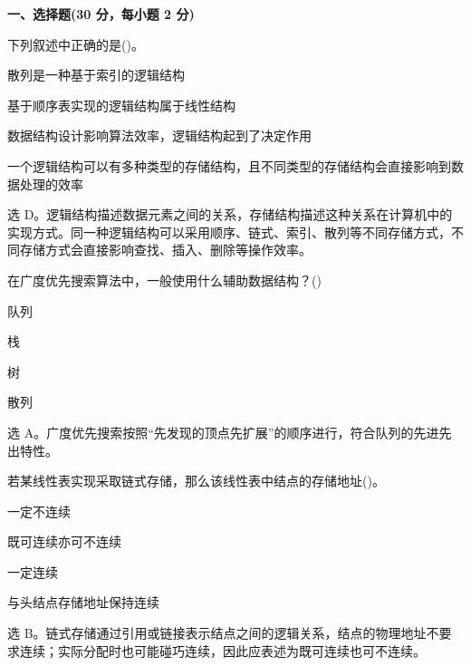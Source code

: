 \textbf{一、选择题(30 分，每小题 2 分)}

\begin{question}
下列叙述中正确的是(\quad)。
\begin{choiceoptions}[1]
  \item 散列是一种基于索引的逻辑结构
  \item 基于顺序表实现的逻辑结构属于线性结构
  \item 数据结构设计影响算法效率，逻辑结构起到了决定作用
  \item 一个逻辑结构可以有多种类型的存储结构，且不同类型的存储结构会直接影响到数据处理的效率
\end{choiceoptions}
\begin{solution}
选 D。逻辑结构描述数据元素之间的关系，存储结构描述这种关系在计算机中的实现方式。同一种逻辑结构可以采用顺序、链式、索引、散列等不同存储方式，不同存储方式会直接影响查找、插入、删除等操作效率。
\end{solution}
\end{question}

\begin{question}
在广度优先搜索算法中，一般使用什么辅助数据结构？(\quad)
\begin{choiceoptions}[2]
  \item 队列
  \item 栈
  \item 树
  \item 散列
\end{choiceoptions}
\begin{solution}
选 A。广度优先搜索按照“先发现的顶点先扩展”的顺序进行，符合队列的先进先出特性。
\end{solution}
\end{question}

\begin{question}
若某线性表实现采取链式存储，那么该线性表中结点的存储地址(\quad)。
\begin{choiceoptions}[2]
  \item 一定不连续
  \item 既可连续亦可不连续
  \item 一定连续
  \item 与头结点存储地址保持连续
\end{choiceoptions}
\begin{solution}
选 B。链式存储通过引用或链接表示结点之间的逻辑关系，结点的物理地址不要求连续；实际分配时也可能碰巧连续，因此应表述为既可连续也可不连续。
\end{solution}
\end{question}

